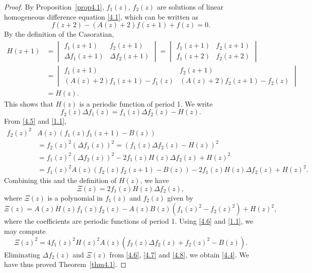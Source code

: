 \documentclass{amsart}
\begin{document}
\begin{proof}
By Proposition~\ref{prop4.1}, $f_1(z)$, $f_2(z)$ are solutions of linear homogeneous difference equation \eqref{4.1}, which can be written as
$$
f(z+2)-(A(z)+2)f(z+1)+f(z)=0.
$$
By the definition of the Casoratian,
\begin{align*}
H(z+1)&=\begin{vmatrix}
f_1(z+1)&f_2(z+1)\\
\Delta f_1(z+1)&\Delta f_2(z+1)
\end{vmatrix}
=\begin{vmatrix}
f_1(z+1)&f_2(z+1)\\
f_1(z+2)&f_2(z+2)
\end{vmatrix}  \\
&=\begin{vmatrix}
f_1(z+1)&f_2(z+1)\\
(A(z)+2)f_1(z+1)-f_1(z)&(A(z)+2)f_2(z+1)-f_2(z)
\end{vmatrix}\\
&=H(z).
\end{align*}
This shows that $H(z)$ is a periodic function of period 1. We write
\begin{equation}
f_2(z)\Delta f_1(z)=f_1(z)\Delta f_2(z)-H(z).\label{4.5}
\end{equation}
From \eqref{4.5} and \eqref{1.1},
\begin{align*}
f_2(z)^2&A(z)(f_1(z)f_1(z+1)-B(z))\\
&=f_2(z)^2(\Delta f_1(z))^2=(f_1(z)\Delta f_2(z)-H(z))^2\\
&=f_1(z)^2(\Delta f_2(z))^2-2f_1(z)H(z)\Delta f_2(z)+H(z)^2\\
&=f_1(z)^2A(z)(f_2(z)f_2(z+1)-B(z))-2f_1(z)H(z)\Delta f_2(z)+H(z)^2.
\end{align*}
Combining this and the definition of $H(z)$, we have
\begin{equation}
\Xi(z)=2f_1(z)H(z)\Delta f_2(z), \label{4.6}
 \end{equation}
where $\Xi(z)$ is a polynomial in $f_1(z)$ and $f_2(z)$ given by
 \begin{equation}
\Xi(z)=A(z)H(z)f_1(z)f_2(z)-A(z)B(z)(f_1(z)^2-f_2(z)^2)+H(z)^2,\label{4.7}
  \end{equation}
where the coefficients are periodic functions of period 1. Using \eqref{4.6} and \eqref{1.1}, we may compute
\begin{equation}
\Xi(z)^2=4f_1(z)^2H(z)^2A(z)(f_2(z)\Delta f_2(z)+f_2(z)^2-B(z)).\label{4.8}
\end{equation}
Eliminating $\Delta f_2(z)$ and $\Xi(z)$ from \eqref{4.6}, \eqref{4.7} and \eqref{4.8}, we obtain \eqref{4.4}. We have thus proved Theorem~\ref{thm4.1}.
\end{proof}
\end{document}

